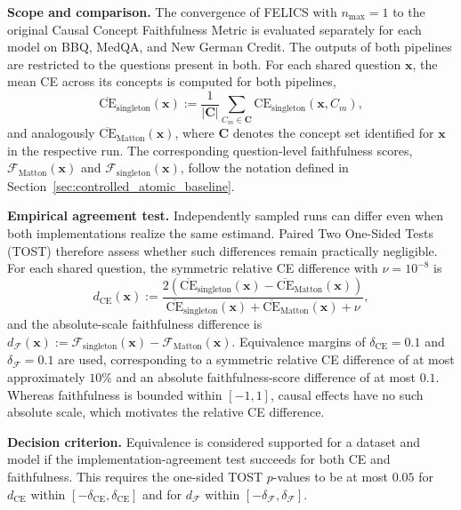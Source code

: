 \noindent\textbf{Scope and comparison.} The convergence of FELICS with $n_{\max}=1$ to the original Causal Concept Faithfulness Metric is evaluated separately for each model on BBQ, MedQA, and New German Credit. The outputs of both pipelines are restricted to the questions present in both. For each shared question $\mathbf{x}$, the mean CE across its concepts is computed for both pipelines,
\begin{equation}
	\overline{\mathrm{CE}}_{\mathrm{singleton}}(\mathbf{x}) := \frac{1}{|\mathbf{C}|}\sum_{C_m\in\mathbf{C}} \mathrm{CE}_{\mathrm{singleton}}(\mathbf{x},C_m),
\end{equation}
and analogously $\overline{\mathrm{CE}}_{\mathrm{Matton}}(\mathbf{x})$, where $\mathbf{C}$ denotes the concept set identified for $\mathbf{x}$ in the respective run. The corresponding question-level faithfulness scores, $\mathcal{F}_{\mathrm{Matton}}(\mathbf{x})$ and $\mathcal{F}_{\mathrm{singleton}}(\mathbf{x})$, follow the notation defined in Section~\ref{sec:controlled_atomic_baseline}.

\noindent\textbf{Empirical agreement test.} Independently sampled runs can differ even when both implementations realize the same estimand. Paired Two One-Sided Tests (TOST) therefore assess whether such differences remain practically negligible. For each shared question, the symmetric relative CE difference with $\nu = 10^{-8}$ is
\begin{equation}
	d_{\mathrm{CE}}(\mathbf{x}) :=
	\frac{2\left(\overline{\mathrm{CE}}_{\mathrm{singleton}}(\mathbf{x})-\overline{\mathrm{CE}}_{\mathrm{Matton}}(\mathbf{x})\right)}
	{\overline{\mathrm{CE}}_{\mathrm{singleton}}(\mathbf{x})+\overline{\mathrm{CE}}_{\mathrm{Matton}}(\mathbf{x})+\nu},
\end{equation}
and the absolute-scale faithfulness difference is $d_{\mathcal{F}}(\mathbf{x}):=\mathcal{F}_{\mathrm{singleton}}(\mathbf{x})-\mathcal{F}_{\mathrm{Matton}}(\mathbf{x})$. Equivalence margins of $\delta_{\mathrm{CE}}=0.1$ and $\delta_{\mathcal{F}}=0.1$ are used, corresponding to a symmetric relative CE difference of at most approximately $10\%$ and an absolute faithfulness-score difference of at most $0.1$. Whereas faithfulness is bounded within $[-1,1]$, causal effects have no such absolute scale, which motivates the relative CE difference.

\noindent\textbf{Decision criterion.} Equivalence is considered supported for a dataset and model if the implementation-agreement test succeeds for both CE and faithfulness. This requires the one-sided TOST $p$-values to be at most $0.05$ for $d_{\mathrm{CE}}$ within $[-\delta_{\mathrm{CE}},\delta_{\mathrm{CE}}]$ and for $d_{\mathcal{F}}$ within $[-\delta_{\mathcal{F}},\delta_{\mathcal{F}}]$.

